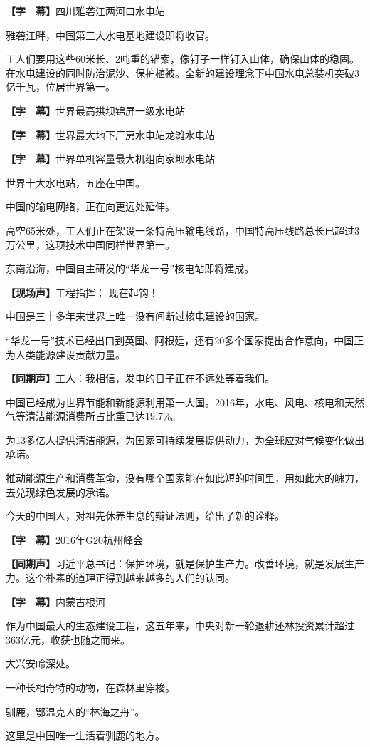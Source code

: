 \documentclass{ctexart}
\newcommand{\zkh}[1]{\textbf{\hspace{-2.7em} 【#1】}}
\begin{document}
 \zkh{字　幕}四川雅砻江两河口水电站

 雅砻江畔，中国第三大水电基地建设即将收官。

工人们要用这些60米长、2吨重的锚索，像钉子一样钉入山体，确保山体的稳固。在水电建设的同时防治泥沙、保护植被。全新的建设理念下中国水电总装机突破3亿千瓦，位居世界第一。

 \zkh{字　幕}世界最高拱坝锦屏一级水电站

 \zkh{字　幕}世界最大地下厂房水电站龙滩水电站

 \zkh{字　幕}世界单机容量最大机组向家坝水电站

 世界十大水电站，五座在中国。

 中国的输电网络，正在向更远处延伸。

高空65米处，工人们正在架设一条特高压输电线路，中国特高压线路总长已超过3万公里，这项技术中国同样世界第一。

 东南沿海，中国自主研发的``华龙一号''核电站即将建成。

 \zkh{现场声}工程指挥： 现在起钩！

 中国是三十多年来世界上唯一没有间断过核电建设的国家。

``华龙一号''技术已经出口到英国、阿根廷，还有20多个国家提出合作意向，中国正为人类能源建设贡献力量。

 \zkh{同期声}工人：我相信，发电的日子正在不远处等着我们。

 
中国已经成为世界节能和新能源利用第一大国。2016年，水电、风电、核电和天然气等清洁能源消费所占比重已达19.7{\%}。

为13多亿人提供清洁能源，为国家可持续发展提供动力，为全球应对气候变化做出承诺。

推动能源生产和消费革命，没有哪个国家能在如此短的时间里，用如此大的魄力，去兑现绿色发展的承诺。

 今天的中国人，对祖先休养生息的辩证法则，给出了新的诠释。

 \zkh{字　幕}2016年G20杭州峰会

 \zkh{同期声}习近平总书记：保护环境，就是保护生产力。改善环境，就是发展生产力。这个朴素的道理正得到越来越多的人们的认同。

 \zkh{字　幕}内蒙古根河

 
作为中国最大的生态建设工程，这五年来，中央对新一轮退耕还林投资累计超过363亿元，收获也随之而来。

 大兴安岭深处。

 一种长相奇特的动物，在森林里穿梭。

 驯鹿，鄂温克人的``林海之舟''。

 这里是中国唯一生活着驯鹿的地方。
\end{document}
